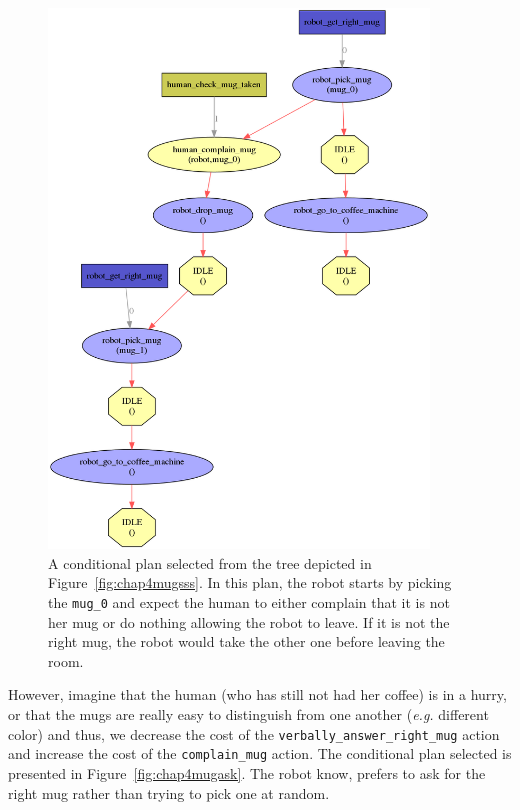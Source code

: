 \documentclass[a4paper,11pt,twoside]{StyleThese}
\begin{document}
\begin{figure}[hbtp]
\centering
\includegraphics[width=0.9\textwidth]{figures/chapter4/mug_selection_trials.png}
\caption{A conditional plan selected from the tree depicted in Figure~\ref{fig:chap4mugsss}. In this plan, the robot starts by picking the \texttt{mug\_0} and expect the human to either complain that it is not her mug or do nothing allowing the robot to leave. If it is not the right mug, the robot would take the other one before leaving the room.}
\label{fig:chap4mugtrialerror}
\end{figure}

However, imagine that the human (who has still not had her coffee) is in a hurry, or that the mugs are really easy to distinguish from one another (\textit{e.g.} different color) and thus, we decrease the cost of the \verb'verbally_answer_right_mug' action and increase the cost of the \verb'complain_mug' action. The conditional plan selected is presented in Figure~\ref{fig:chap4mugask}. The robot know, prefers to ask for the right mug rather than trying to pick one at random.
\end{document}
